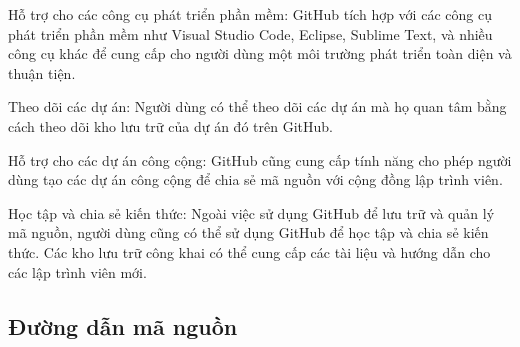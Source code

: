 \begin{enumerate}[a)]
Hỗ trợ cho các công cụ phát triển phần mềm: GitHub tích hợp với các công cụ phát triển phần mềm như Visual Studio Code, Eclipse, Sublime Text, và nhiều công cụ khác để cung cấp cho người dùng một môi trường phát triển toàn diện và thuận tiện.


Theo dõi các dự án: Người dùng có thể theo dõi các dự án mà họ quan tâm bằng cách theo dõi kho lưu trữ của dự án đó trên GitHub.


Hỗ trợ cho các dự án công cộng: GitHub cũng cung cấp tính năng cho phép người dùng tạo các dự án công cộng để chia sẻ mã nguồn với cộng đồng lập trình viên.


Học tập và chia sẻ kiến thức: Ngoài việc sử dụng GitHub để lưu trữ và quản lý mã nguồn, người dùng cũng có thể sử dụng GitHub để học tập và chia sẻ kiến thức. Các kho lưu trữ công khai có thể cung cấp các tài liệu và hướng dẫn cho các lập trình viên mới.

  
\end{enumerate}

\subsection*{Đường dẫn mã nguồn}

\clearpage
